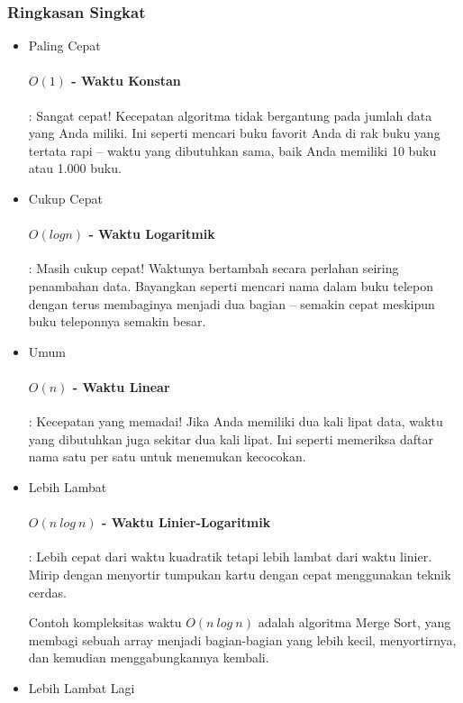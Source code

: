 \documentclass{article}
\begin{document}
\subsubsection{Ringkasan Singkat}
\begin{itemize}
    \item Paling Cepat

          \paragraph{\(O(1)\) - Waktu Konstan}: Sangat cepat! Kecepatan algoritma tidak bergantung pada jumlah data yang Anda miliki. Ini seperti mencari buku favorit Anda di rak buku yang tertata rapi – waktu yang dibutuhkan sama, baik Anda memiliki 10 buku atau 1.000 buku.
    \item Cukup Cepat

          \paragraph{\(O(log n)\) - Waktu Logaritmik}: Masih cukup cepat! Waktunya bertambah secara perlahan seiring penambahan data. Bayangkan seperti mencari nama dalam buku telepon dengan terus membaginya menjadi dua bagian – semakin cepat meskipun buku teleponnya semakin besar.
    \item Umum

          \paragraph{\(O(n)\) - Waktu Linear}: Kecepatan yang memadai! Jika Anda memiliki dua kali lipat data, waktu yang dibutuhkan juga sekitar dua kali lipat. Ini seperti memeriksa daftar nama satu per satu untuk menemukan kecocokan.
    \item Lebih Lambat

          \paragraph{\(O(n\ log\ n)\) - Waktu Linier-Logaritmik}: Lebih cepat dari waktu kuadratik tetapi lebih lambat dari waktu linier. Mirip dengan menyortir tumpukan kartu dengan cepat menggunakan teknik cerdas.

          Contoh kompleksitas waktu \(O(n\ log\ n)\) adalah algoritma Merge Sort, yang membagi sebuah array menjadi bagian-bagian yang lebih kecil, menyortirnya, dan kemudian menggabungkannya kembali.
    \item Lebih Lambat Lagi


\end{itemize}
\end{document}
